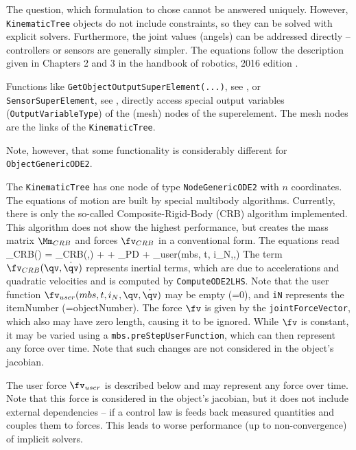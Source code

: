     The question, which formulation to chose cannot be answered uniquely. However, \texttt{KinematicTree} objects
    do not include constraints, so they can be solved with explicit solvers. Furthermore, the joint values (angels)
    can be addressed directly -- controllers or sensors are generally simpler.
    The equations follow the description given in Chapters 2 and 3 in the handbook of robotics, 2016 edition \cite{Siciliano2016}.

    Functions like \texttt{GetObjectOutputSuperElement(...)}, see , 
    or \texttt{SensorSuperElement}, see , directly access special output variables
    (\texttt{OutputVariableType}) of the (mesh) nodes of the superelement. The mesh nodes are the links of the
    \texttt{KinematicTree}.
    
    Note, however, that some functionality is considerably different for \texttt{ObjectGenericODE2}.
    
    The \texttt{KinematicTree} has one node of type \texttt{NodeGenericODE2} with $n$ coordinates.
    The equations of motion are built by special multibody algorithms. Currently, there is only the
    so-called Composite-Rigid-Body (CRB) algorithm implemented.
    This algorithm does not show the highest performance, but creates the mass matrix $\Mm_{CRB}$ and forces $\fv_{CRB}$
    in a conventional form. The equations read
    \be \label{eq_ObjectGenericODE2_EOM}
      \Mm_{CRB}(\qv) \ddot \qv = \fv_{CRB}(\qv,\dot \qv) + \fv + \fv_{PD} + \fv_{user}(mbs, t, i_N,\qv,\dot \qv)
    \ee
    The term $\fv_{CRB}(\qv,\dot \qv)$ represents inertial terms, which are due to accelerations and 
    quadratic velocities and is computed by \texttt{ComputeODE2LHS}.
    Note that the user function $\fv_{user}(mbs, t, i_N,\qv,\dot \qv)$ may be empty (=0), 
    and \texttt{iN} represents the itemNumber (=objectNumber). 
    The force $\fv$ is given by the \texttt{jointForceVector}, which also may have zero length, causing it to be ignored.
    While $\fv$ is constant, it may be varied using a \texttt{mbs.preStepUserFunction}, which can
    then represent any force over time. Note that such changes are not considered in the object's jacobian.
    
    The user force $\fv_{user}$ is described below and may represent any force over time.
    Note that this force is considered in the object's jacobian, but it does not include external 
    dependencies -- if a control law is feeds back measured quantities and couples them to forces.
    This leads to worse performance (up to non-convergence) of implicit solvers.
    
